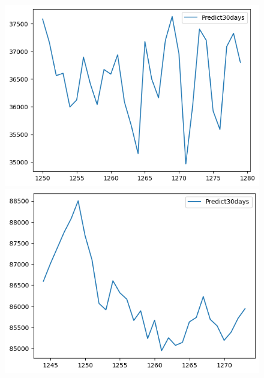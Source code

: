 \begin{figure}[H]
\begin{minipage}{0.15\textwidth}
    \centering
    \includegraphics[width=1\textwidth]{resources/chapter-5/predicted/BIDV_NBeats_9-1_30days.png}
    \end{minipage}
    \hfill
    \begin{minipage}{0.15\textwidth}
    \centering
    \includegraphics[width=1\textwidth]{resources/chapter-5/predicted/VCB_NBeats_7-3_30days.png}
    \end{minipage}
    \hfill
    \begin{minipage}{0.15\textwidth}
    \centering

\end{minipage}
\end{figure}
